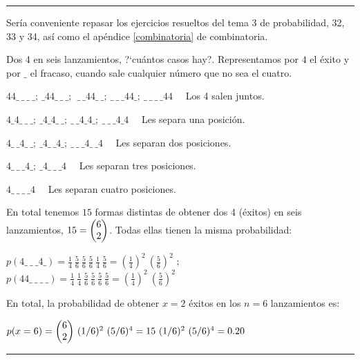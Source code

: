 \begin{small}
\begin{adjustwidth}{20pt}{0pt}

\textcolor{gris}{\rule{75mm}{0.1mm}}

\textcolor{gris}{Sería conveniente repasar los ejercicios resueltos del tema 3 de probabilidad, 32, 33 y 34, así como el apéndice \ref{combinatoria} de combinatoria.}

\vspace{2mm}  \textcolor{gris}{Dos 4 en seis lanzamientos, ?`cuántos casos hay?. Representamos por $4$ el éxito y por $\_$ el fracaso, cuando sale cualquier número que no sea el cuatro.}

\vspace{2mm}\textcolor{gris}{$44\_\ \_\ \_\ \_; \ \_44\_\ \_\ \_; \ \ \_\ \_44\_ \ \_;\ \_\ \_\ \_44\_;\  \_\ \_\ \_\ \_ 44\quad $  Los 4 salen juntos.}


\textcolor{gris}{$4\_4\_\ \_\ \_;\ \_4\_4\_\ \_;\ \_\ \_4\_4\_;\ \_\ \_\ \_4\_4 \quad$ Les separa una posición.}

\textcolor{gris}{$4\_\ \_4\_\ \_;\ \_4\_\ \_4\_;\ \_\ \_\ \_4\_\ \_4 \quad$ Les separan dos posiciones.}

\textcolor{gris}{$4\_ \ \_\ \_4\_;\ \_4\_\ \_\ \_4 \quad$ Les separan tres posiciones.}

\textcolor{gris}{$4\_\ \_\ \_\ \_4 \quad$ Les separan cuatro posiciones.}

\vspace{2mm}\textcolor{gris}{En total tenemos $15$ formas distintas de obtener dos 4 (éxitos) en seis lanzamientos, $15=\mqty(6\\2)$. Todas ellas tienen la misma probabilidad:}

\vspace{2mm}\textcolor{gris}{$p(4\_\ \_\ \_4\_)=\frac 1 4 \ \frac 5 6 \ \frac 5 6 \ \frac 5 6 \ \frac 1 4 \ \frac 5 6 = \left( \frac 1 4 \right)^2\ \left( \frac 5 6 \right)^2$ $;\quad$ $p(44\_\ \_\ \_\ \_)=\frac 1 4 \ \frac 1 4 \ \frac 5 6 \ \frac 5 6 \ \frac 5 6 \ \frac 5 6 = \left( \frac 1 4 \right)^2\ \left( \frac 5 6 \right)^2$}

\vspace{2mm}\textcolor{gris}{En total, la probabilidad de obtener $x=2$ éxitos en los $n=6$ lanzamientos es:}

\vspace{2mm}\textcolor{gris}{$p(x=6)=\mqty(6\\2) \  (1/6)^2 \ (5/6)^4 = 15 \  (1/6)^2 \ (5/6)^4  =0.20$}

\vspace{-4mm}
\begin{flushright}
\textcolor{gris}{\rule{100mm}{0.1mm}}	
\end{flushright}

	
\end{adjustwidth}
\end{small}


